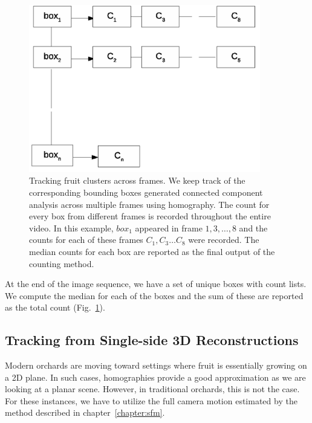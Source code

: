 \begin{figure}[!hbpt]

        \centering        
            \includegraphics[width =0.90\textwidth]{figures/map_yield/mergeApples_.pdf}         
        
  
  \caption[Tracking a fruit cluster across frames by homography]{Tracking fruit clusters across frames. We keep track of the corresponding bounding boxes generated connected component analysis across multiple frames using homography. The count for every box from different frames is recorded throughout the entire video. In this example, $box_1$ appeared in frame $1,3, \ldots ,8$ and the counts for each of these frames $C_1,C_3 \ldots C_8$ were recorded. The median counts for each box are reported as the final output of the counting method.}
   \label{fig:mergecount}
\end{figure}    

At the end of the image sequence, we have a set of unique boxes with count lists. We compute the median for each of the boxes and the sum of these are reported as the total count (Fig.~\ref{fig:mergecount}).




\subsection{Tracking from Single-side 3D Reconstructions}\label{subsec:tracking} 
Modern orchards are moving toward settings where fruit is essentially growing on a 2D plane. In such cases, homographies provide a good approximation as we are looking at a planar scene. However, in traditional orchards, this is not the case. For these instances, we have to utilize the full camera motion estimated by the method described in chapter~\ref{chapter:sfm}.


